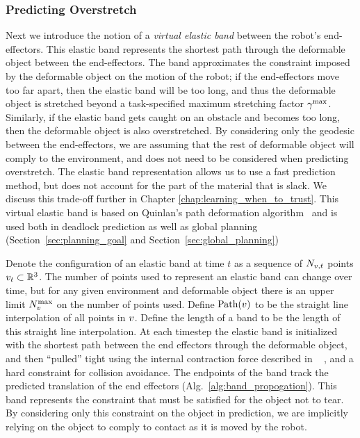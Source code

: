 \subsubsection{Predicting Overstretch}
\label{sec:overstretch}


Next we introduce the notion of a \textit{virtual elastic band} between the robot's end-effectors. This elastic band represents the shortest path through the deformable object between the end-effectors. The band approximates the constraint imposed by the deformable object on the motion of the robot; if the end-effectors move too far apart, then the elastic band will be too long, and thus the deformable object is stretched beyond a task-specified maximum stretching factor $\gamma^{\textrm{max}}$. Similarly, if the elastic band gets caught on an obstacle and becomes too long, then the deformable object is also overstretched. By considering only the geodesic between the end-effectors, we are assuming that the rest of deformable object will comply to the environment, and does not need to be considered when predicting overstretch. The elastic band representation allows us to use a fast prediction method, but does not account for the part of the material that is slack. We discuss this trade-off further in Chapter \ref{chap:learning_when_to_trust}. This virtual elastic band is based on Quinlan's path deformation algorithm~\cite{Quinlan1994} and is used both in deadlock prediction as well as global planning (Section~\ref{sec:planning_goal} and Section~\ref{sec:global_planning})


Denote the configuration of an elastic band at time $t$ as a sequence of $N_{v,t}$ points $v_t \subset \mathbb{R}^3$. The number of points used to represent an elastic band can change over time, but for any given environment and deformable object there is an upper limit $N_v^\textrm{max}$ on the number of points used. Define $\textrm{Path}(v)$ to be the straight line interpolation of all points in $v$. Define the length of a band to be the length of this straight line interpolation. At each timestep the elastic band is initialized with the shortest path between the end effectors through the deformable object, and then ``pulled'' tight using the internal contraction force described in ~\cite{Quinlan1994} , and a hard constraint for collision avoidance. The endpoints of the band track the predicted translation of the end effectors (Alg.~\ref{alg:band_propogation}). This band represents the constraint that must be satisfied for the object not to tear. By considering only this constraint on the object in prediction, we are implicitly relying on the object to comply to contact as it is moved by the robot. %



